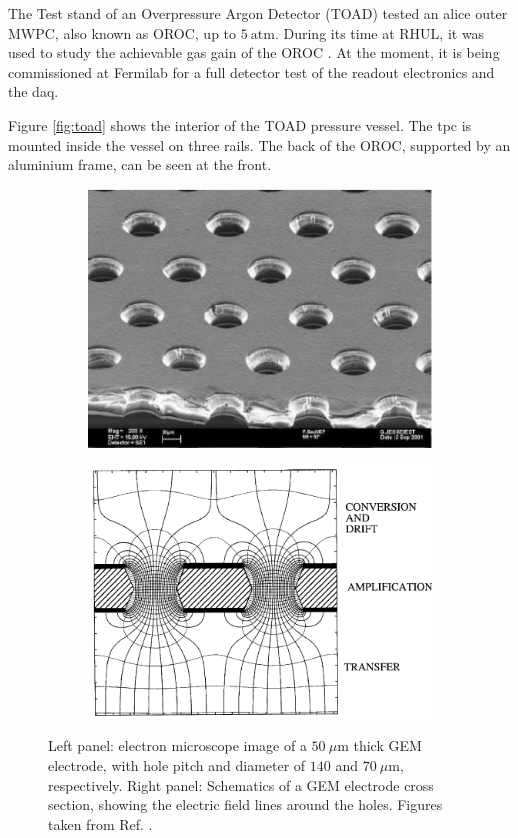 The Test stand of an Overpressure Argon Detector (TOAD) tested an \gls{alice} outer MWPC, also known as OROC, up to $5~\mathrm{atm}$. During its time at RHUL, it was used to study the achievable gas gain of the OROC \cite{Ritchie-Yates2023}. At the moment, it is being commissioned at Fermilab for a full detector test of the readout electronics and the \gls{daq}.

Figure \ref{fig:toad} shows the interior of the TOAD pressure vessel. The \gls{tpc} is mounted inside the vessel on three rails. The back of the OROC, supported by an aluminium frame, can be seen at the front.

\begin{figure}[h!]
	\begin{subfigure}{0.49\textwidth}
		\centering
		\includegraphics[width=.90\linewidth]{Images/ND-GAr/GEM_photo.jpg}
	\end{subfigure}
	\begin{subfigure}{0.49\textwidth}
		\centering
		\includegraphics[width=.90\linewidth]{Images//ND-GAr/GEM_diagram.pdf}
	\end{subfigure}
	\caption[Electron microscope image and schematic diagram of a GEM electrode.]{Left panel: electron microscope image of a $50~\mu\mathrm{m}$ thick GEM electrode, with hole pitch and diameter of $140$ and $70~\mu\mathrm{m}$, respectively. Right panel: Schematics of a GEM electrode cross section, showing the electric field lines around the holes. Figures taken from Ref. \cite{Sauli2016}.}
	\label{fig:gem}
\end{figure}

